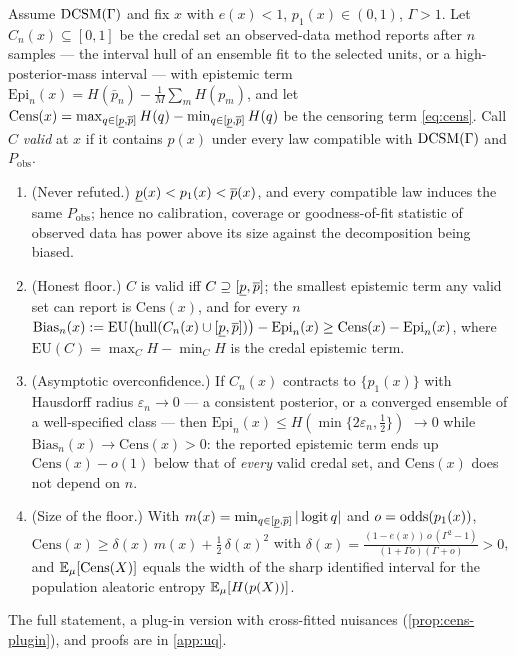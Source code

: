 \begin{corollary}
\label{cor:uq}
Assume $\textup{DCSM}(\Gamma)$ and fix $x$ with $e(x)<1$, $p_1(x)\in(0,1)$, $\Gamma>1$.
Let $C_n(x)\subseteq[0,1]$ be the credal set an observed-data method reports
after $n$ samples --- the interval hull of an ensemble fit to the selected
units, or a high-posterior-mass interval --- with epistemic term
$\mathrm{Epi}_n(x)=H(\bar p_n)-\tfrac1M\sum_mH(p_m)$, and let
$\mathrm{Cens}(x)=\max_{q\in[\underline{p},\overline{p}]}H(q)-\min_{q\in[\underline{p},\overline{p}]}H(q)$ be the
censoring term \eqref{eq:cens}. Call $C$ \emph{valid} at $x$ if it contains
$p(x)$ under every law compatible with $\textup{DCSM}(\Gamma)$ and $P_{\mathrm{obs}}$.
\begin{enumerate}
\item[(i)] \textup{(Never refuted.)} $\underline{p}(x)<p_1(x)<\overline{p}(x)$, and every
  compatible law induces the same $P_{\mathrm{obs}}$; hence no calibration,
  coverage or goodness-of-fit statistic of observed data has power above its
  size against the decomposition being biased.
\item[(ii)] \textup{(Honest floor.)} $C$ is valid iff $C\supseteq[\underline{p},\overline{p}]$;
  the smallest epistemic term any valid set can report is $\mathrm{Cens}(x)$,
  and for every $n$
  $\mathrm{Bias}_n(x):=\mathrm{EU}\big(\mathrm{hull}(C_n(x)\cup[\underline{p},\overline{p}])\big)-\mathrm{Epi}_n(x)
  \ge\mathrm{Cens}(x)-\mathrm{Epi}_n(x)$,
  where $\mathrm{EU}(C)=\max_C H-\min_C H$ is the credal epistemic term.
\item[(iii)] \textup{(Asymptotic overconfidence.)} If $C_n(x)$ contracts to
  $\{p_1(x)\}$ with Hausdorff radius $\varepsilon_n\to0$ --- a consistent
  posterior, or a converged ensemble of a well-specified class --- then
  $\mathrm{Epi}_n(x)\le H(\min\{2\varepsilon_n,\tfrac12\})$ $\to0$ while
  $\mathrm{Bias}_n(x)\to\mathrm{Cens}(x)>0$: the reported epistemic term ends up
  $\mathrm{Cens}(x)-o(1)$ below that of \emph{every} valid credal set, and
  $\mathrm{Cens}(x)$ does not depend on $n$.
\item[(iv)] \textup{(Size of the floor.)} With
  $m(x)=\min_{q\in[\underline{p},\overline{p}]}|\operatorname{logit} q|$ and $o=\operatorname{odds}(p_1(x))$,
  $\mathrm{Cens}(x)\ge\delta(x)\,m(x)+\tfrac12\,\delta(x)^2$ with
  $\delta(x)=\frac{(1-e(x))\,o\,(\Gamma^2-1)}{(1+\Gamma o)(\Gamma+o)}>0$,
  and $\mathbb{E}_\mu[\mathrm{Cens}(X)]$ equals the width of the sharp identified
  interval for the population aleatoric entropy $\mathbb{E}_\mu[H(p(X))]$.
\end{enumerate}
The full statement, a plug-in version with cross-fitted nuisances
(\cref{prop:cens-plugin}), and proofs are in \cref{app:uq}.
\end{corollary}


